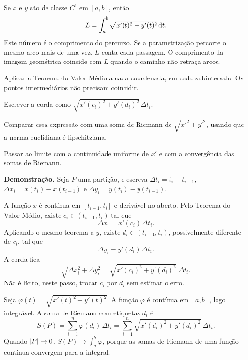 \documentclass[11pt,a4paper]{article}
\begin{document}
\begin{teorema}[Comprimento]
Se \(x\) e \(y\) são de classe \(C^1\) em \([a,b]\), então
\begin{equation}
L=\int_{a}^{b}\sqrt{x'(t)^{2}+y'(t)^{2}}\,\mathrm{d} t.
\label{eq:comprimento}
\end{equation}
Este número é o comprimento do percurso. Se a parametrização percorre o mesmo arco mais de uma vez, \(L\) conta cada passagem. O comprimento da imagem geométrica coincide com \(L\) quando o caminho não retraça arcos.
\end{teorema}

\begin{esqueleto}
\item Aplicar o Teorema do Valor Médio a cada coordenada, em cada subintervalo. Os pontos intermediários não precisam coincidir.
\item Escrever a corda como \(\sqrt{x'(c_{i})^{2}+y'(d_{i})^{2}}\,\Delta t_{i}\).
\item Comparar essa expressão com uma soma de Riemann de \(\sqrt{x'^{2}+y'^{2}}\), usando que a norma euclidiana é lipschitziana.
\item Passar ao limite com a continuidade uniforme de \(x'\) e com a convergência das somas de Riemann.
\end{esqueleto}

\noindent\textbf{Demonstração.}
Seja \(P\) uma partição, e escreva \(\Delta t_{i}=t_{i}-t_{i-1}\), \(\Delta x_{i}=x(t_{i})-x(t_{i-1})\) e \(\Delta y_{i}=y(t_{i})-y(t_{i-1})\).

A função \(x\) é contínua em \([t_{i-1},t_{i}]\) e derivável no aberto. Pelo Teorema do Valor Médio, existe \(c_{i}\in(t_{i-1},t_{i})\) tal que
\[
\Delta x_{i}=x'(c_{i})\,\Delta t_{i}.
\]
Aplicando o mesmo teorema a \(y\), existe \(d_{i}\in(t_{i-1},t_{i})\), possivelmente diferente de \(c_{i}\), tal que
\[
\Delta y_{i}=y'(d_{i})\,\Delta t_{i}.
\]
A corda fica
\[
\sqrt{\Delta x_{i}^{2}+\Delta y_{i}^{2}}
=\sqrt{x'(c_{i})^{2}+y'(d_{i})^{2}}\;\Delta t_{i}.
\]
Não é lícito, neste passo, trocar \(c_{i}\) por \(d_{i}\) sem estimar o erro.

Seja \(\varphi(t)=\sqrt{x'(t)^{2}+y'(t)^{2}}\). A função \(\varphi\) é contínua em \([a,b]\), logo integrável. A soma de Riemann com etiquetas \(d_{i}\) é
\[
S(P)=\sum_{i=1}^{n}\varphi(d_{i})\,\Delta t_{i}
=\sum_{i=1}^{n}\sqrt{x'(d_{i})^{2}+y'(d_{i})^{2}}\;\Delta t_{i}.
\]
Quando \(\left\lvert P \right\rvert\to 0\), \(S(P)\to\int_{a}^{b}\varphi\), porque as somas de Riemann de uma função contínua convergem para a integral.
\end{document}
